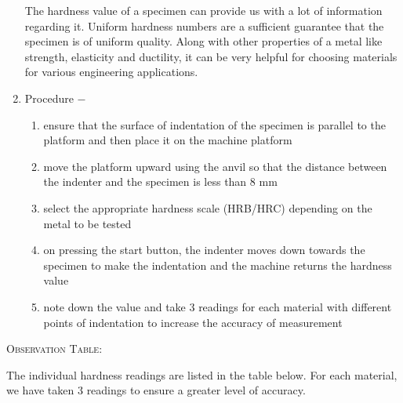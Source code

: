\documentclass[a4paper, 11pt]{article}
\begin{document}
\begin{enumerate}[label=(\alph*)]
The hardness value of a specimen can provide us with a lot of information regarding it. Uniform hardness numbers are a sufficient guarantee that the specimen is of uniform quality. Along with other properties of a metal like strength, elasticity and ductility, it can be very helpful for choosing materials for various engineering applications.
	\item {Procedure} $-$ 
	\begin{enumerate}[label=\roman*)]
		\item ensure that the surface of indentation of the specimen is parallel to the platform and then place it on the machine platform
		\item move the platform upward using the anvil so that the distance between the indenter and the specimen is less than 8 mm
		\item select the appropriate hardness scale (HRB/HRC) depending on the metal to be tested
		\item on pressing the start button, the indenter moves down towards the specimen to make the indentation and the machine returns the hardness value
		\item note down the value and take 3 readings for each material with different points of indentation to increase the accuracy of measurement
	\end{enumerate}
\end{enumerate}

\textsc{Observation Table:}
\vspace{2mm}

The individual hardness readings are listed in the table below. For each material, we have taken 3 readings to ensure a greater level of accuracy.
\end{document}

